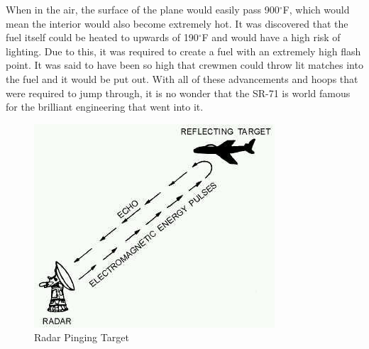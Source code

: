 \documentclass[conf]{new-aiaa}
\begin{document}
When in the air, the surface of the plane would easily pass 900$^{\circ}$F, which would mean the interior would also become extremely hot. It was discovered that the fuel itself could be heated to upwards of 190$^{\circ}$F and would have a high risk of lighting. Due to this, it was required to create a fuel with an extremely high flash point. It was said to have been so high that crewmen could throw lit matches into the fuel and it would be put out. With all of these advancements and hoops that were required to jump through, it is no wonder that the SR-71 is world famous for the brilliant engineering that went into it.
\pagebreak

\begin{figure}
    \centering
    \includegraphics[width=0.5\linewidth]{image1.png}
    \caption{Radar Pinging Target}
    \label{fig1}
\end{figure}
\end{document}
